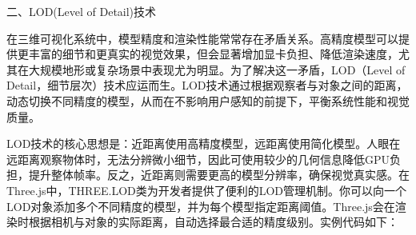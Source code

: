 二、LOD(Level of Detail)技术

在三维可视化系统中，模型精度和渲染性能常常存在矛盾关系。高精度模型可以提供更丰富的细节和更真实的视觉效果，但会显著增加显卡负担、降低渲染速度，尤其在大规模地形或复杂场景中表现尤为明显。为了解决这一矛盾，LOD（Level of Detail，细节层次）技术应运而生。LOD技术通过根据观察者与对象之间的距离，动态切换不同精度的模型，从而在不影响用户感知的前提下，平衡系统性能和视觉质量。

LOD技术的核心思想是：近距离使用高精度模型，远距离使用简化模型。人眼在远距离观察物体时，无法分辨微小细节，因此可使用较少的几何信息降低GPU负担，提升整体帧率。反之，近距离则需要更高的模型分辨率，确保视觉真实感。在Three.js中，THREE.LOD类为开发者提供了便利的LOD管理机制。你可以向一个LOD对象添加多个不同精度的模型，并为每个模型指定距离阈值。Three.js会在渲染时根据相机与对象的实际距离，自动选择最合适的精度级别。实例代码如下：

